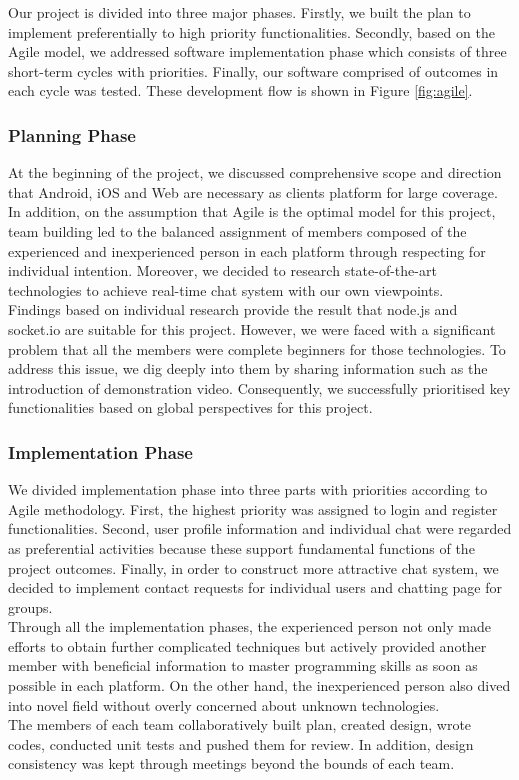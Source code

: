\documentclass{article}
\begin{document}
Our project is divided into three major phases. Firstly, we built the plan to implement preferentially to high priority functionalities. Secondly, based on the Agile model, we addressed software implementation phase which consists of three short-term cycles with priorities. Finally, our software comprised of outcomes in each cycle was tested. These development flow is shown in Figure \ref{fig:agile}.

\subsubsection{Planning Phase}
At the beginning of the project, we discussed comprehensive scope and direction that Android, iOS and Web are necessary as clients platform for large coverage. In addition, on the assumption that Agile is the optimal model for this project, team building led to the balanced assignment of members composed of the experienced and inexperienced person in each platform through respecting for individual intention. Moreover, we decided to research state-of-the-art technologies to achieve real-time chat system with our own viewpoints. \\
Findings based on individual research provide the result that node.js and socket.io are suitable for this project. However, we were faced with a significant problem that all the members were complete beginners for those technologies. To address this issue, we dig deeply into them by sharing information such as the introduction of demonstration video. Consequently, we successfully prioritised key functionalities based on global perspectives for this project.
\subsubsection{Implementation Phase}
We divided implementation phase into three parts with priorities according to Agile methodology. First, the highest priority was assigned to login and register functionalities. Second, user profile information and individual chat were regarded as preferential activities because these support fundamental functions of the project outcomes. Finally, in order to construct more attractive chat system, we decided to implement contact requests for individual users and chatting page for groups.\\
Through all the implementation phases, the experienced person not only made efforts to obtain further complicated techniques but actively provided another member with beneficial information to master programming skills as soon as possible in each platform. On the other hand, the inexperienced person also dived into novel field without overly concerned about unknown technologies.\\
The members of each team collaboratively built plan, created design, wrote codes, conducted unit tests and pushed them for review. In addition, design consistency was kept through meetings beyond the bounds of each team.       
\end{document}
